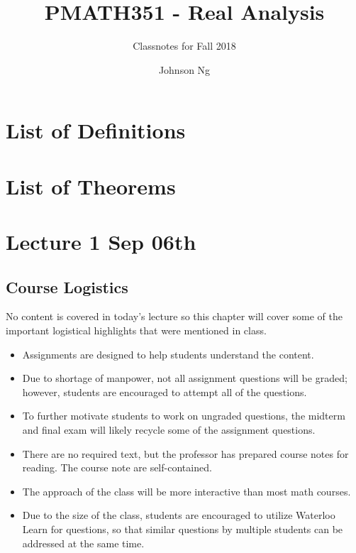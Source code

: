 \documentclass[notoc,notitlepage]{tufte-book}
\title{PMATH351 - Real Analysis}
\author{Johnson Ng}
\subtitle{Classnotes for Fall 2018}
\begin{document}
\hypersetup{pageanchor=false}
\maketitle
\hypersetup{pageanchor=true}
\tableofcontents

\chapter*{\faBook \enspace List of Definitions}

\chapter*{\faCoffee \enspace List of Theorems}

\chapter{Lecture 1 Sep 06th}%
\label{chp:lecture_1_sep_06th}

\section{Course Logistics}%
\label{sec:course_logistics}

No content is covered in today's lecture so this chapter will cover some of the important logistical highlights that were mentioned in class.

\begin{itemize}
  \item Assignments are designed to help students understand the content.
  \item Due to shortage of manpower, not all assignment questions will be graded; however, students are encouraged to attempt all of the questions.
  \item To further motivate students to work on ungraded questions, the midterm and final exam will likely recycle some of the assignment questions.
  \item There are no required text, but the professor has prepared course notes for reading. The course note are self-contained.
  \item The approach of the class will be more interactive than most math courses.
  \item Due to the size of the class, students are encouraged to utilize Waterloo Learn for questions, so that similar questions by multiple students can be addressed at the same time.
\end{itemize}
\end{document}
